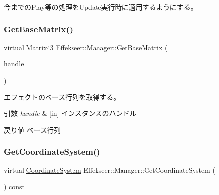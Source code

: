 今までの\+Play等の処理を\+Update実行時に適用するようにする。 

\mbox{\label{class_effekseer_1_1_manager_a095085007e1df5de623fea1a96c31a04}} 
\subsubsection{\texorpdfstring{Get\+Base\+Matrix()}{GetBaseMatrix()}}
{\footnotesize\ttfamily virtual \mbox{\hyperlink{struct_effekseer_1_1_matrix43}{Matrix43}} Effekseer\+::\+Manager\+::\+Get\+Base\+Matrix (\begin{DoxyParamCaption}\item[{\mbox{\hyperlink{namespace_effekseer_afba58b8d812da862190e9bbfc040824a}{Handle}}}]{handle }\end{DoxyParamCaption})\hspace{0.3cm}{\ttfamily [pure virtual]}}



エフェクトのベース行列を取得する。 


\begin{DoxyParams}{引数}
{\em handle} & \mbox{[}in\mbox{]} インスタンスのハンドル \\
\hline
\end{DoxyParams}
\begin{DoxyReturn}{戻り値}
ベース行列 
\end{DoxyReturn}
\mbox{\label{class_effekseer_1_1_manager_a10a79ead8392a39a9f43e771c7de067c}} 
\subsubsection{\texorpdfstring{Get\+Coordinate\+System()}{GetCoordinateSystem()}}
{\footnotesize\ttfamily virtual \mbox{\hyperlink{namespace_effekseer_ac8508f8823c5fcf36aac5d2ddee23765}{Coordinate\+System}} Effekseer\+::\+Manager\+::\+Get\+Coordinate\+System (\begin{DoxyParamCaption}{ }\end{DoxyParamCaption}) const\hspace{0.3cm}{\ttfamily [pure virtual]}}



